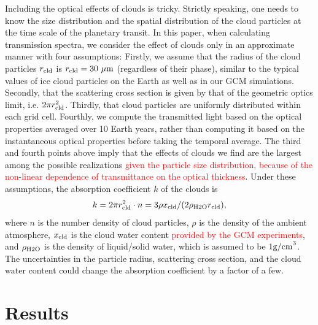 \documentclass[11pt,numberedappendix,twocolappendix,]{emulateapj}
\def\addYF#1{\textcolor{red}{#1}}
\begin{document}
Including the optical effects of clouds is tricky. 
Strictly speaking, one needs to know the size distribution and the spatial distribution of the cloud particles at the time scale of the planetary transit. 
In this paper, when calculating transmission spectra, we consider the effect of clouds only in an approximate manner with four assumptions:
%
Firstly, we assume that the radius of the cloud particles $r_{\rm cld}$ is $r_{\rm cld}=30~\mu {\rm m}$ (regardless of their phase), similar to the typical values of ice cloud particles on the Earth as well as in our GCM simulations.  
%
Secondly, that the scattering cross section is given by that of the geometric optics limit, i.e. $2 \pi r_{\rm cld}^2$. 
%
Thirdly, that cloud particles are uniformly distributed within each grid cell. 
%
Fourthly, we compute the transmitted light based on the optical properties averaged over 10 Earth years, rather than computing it based on the instantaneous optical properties before taking the temporal average. 
%
The third and fourth points above imply that the effects of clouds we find are the largest among the possible realizations \addYF{given the particle size distribution, because of the non-linear dependence of transmittance on the optical thickness}. 
Under these assumptions, the absorption coefficient $k$ of the clouds is %
\begin{equation}
k = 2 \pi r_{\rm cld}^2 \cdot n = 3 \rho x_{\rm cld} / ( 2 \rho_{\rm H2O} r_{\rm cld} ),
\end{equation}
where $n$ is the number density of cloud particles, $\rho $ is the density of the ambient atmosphere, $x_{\rm cld}$ is the cloud water content \addYF{provided by the GCM experiments}, and $\rho_{\rm H2O}$ is the density of liquid/solid water, which is assumed to be $1 {\rm g/cm}^3$. 
The uncertainties in the particle radius, scattering cross section, and the cloud water content could change the absorption coefficient by a factor of a few. 


\section{Results}
\label{s:results}
\end{document}
